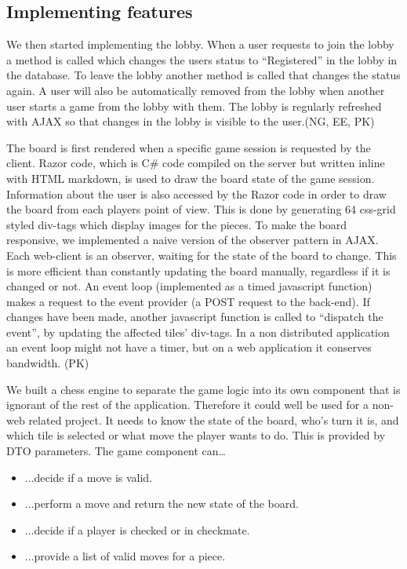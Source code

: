 \documentclass[acmlarge, review=false, screen=true]{acmart}
\begin{document}
  \subsection{Implementing features}
    We then started implementing the lobby. When a user requests to join the lobby a method is called which changes the users status to “Registered” in the lobby in the database. To leave the lobby another method is called that changes the status again. A user will also be automatically removed from the lobby when another user starts a game from the lobby with them. The lobby is regularly refreshed with AJAX so that changes in the lobby is visible to the user.(NG, EE, PK)

    The board is first rendered when a specific game session is requested by the client. Razor code, which is C\# code compiled on the server but written inline with HTML markdown, is used to draw the board state of the game session\cite{razor}. Information about the user is also accessed by the Razor code in order to draw the board from each players point of view. This is done by generating 64 css-grid styled div-tags which display images for the pieces. To make the board responsive, we implemented a naive version of the observer pattern in AJAX\cite{ajax}. Each web-client is an observer, waiting for the state of the board to change. This is more efficient than constantly updating the board manually, regardless if it is changed or not. An event loop (implemented as a timed javascript function) makes a request to the event provider (a POST request to the back-end)\cite{event-loop}. If changes have been made, another javascript function is called to “dispatch the event”, by updating the affected tiles’ div-tags. In a non distributed application an event loop might not have a timer, but on a web application it conserves bandwidth. (PK)

    We built a chess engine to separate the game logic into its own component that is ignorant of the rest of the application. Therefore it could well be used for a non-web related project. It needs to know the state of the board, who’s turn it is, and which tile is selected or what move the player wants to do. This is provided by DTO parameters. The game component can… 
    \begin{itemize}
      \item ...decide if a move is valid.
      \item ...perform a move and return the new state of the board.
      \item ...decide if a player is checked or in checkmate.
      \item ...provide a list of valid moves for a piece.
    \end{itemize}
    
\end{document}
